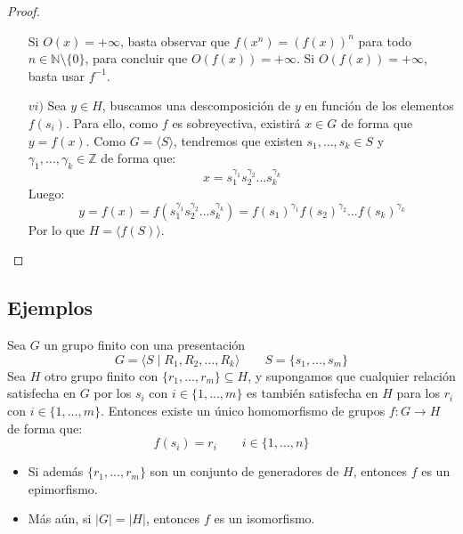 \begin{prop}
\begin{proof}
\begin{enumerate}
                Si $O(x)=+\infty$, basta observar que $f(x^n) = {(f(x))}^{n}$ para todo $n\in \mathbb{N}\setminus\{0\}$, para concluir que $O(f(x))=+\infty$. Si $O(f(x))=+\infty$, basta usar $f^{-1}$.
            \item[$vi)$] Sea $y\in H$, buscamos una descomposición de $y$ en función de los elementos $f(s_i)$. Para ello, como $f$ es sobreyectiva, existirá $x\in G$ de forma que $y = f(x)$. Como $G=\langle S \rangle $, tendremos que existen $s_1,\ldots,s_k\in S$ y $\gamma_1,\ldots,\gamma_k \in \mathbb{Z}$ de forma que:
                \begin{equation*}
                    x = s_1^{\gamma_1}s_2^{\gamma_2}\ldots s_k^{\gamma_k}
                \end{equation*}
                Luego:
                \begin{equation*}
                    y = f(x) = f(s_1^{\gamma_1}s_2^{\gamma_2}\ldots s_k^{\gamma_k}) = {f(s_1)}^{\gamma_1}{f(s_2)}^{\gamma_2} \ldots {f(s_k)}^{\gamma_k}
                \end{equation*}
                Por lo que $H = \langle f(S) \rangle $.
        \end{enumerate}
    \end{proof}
\end{prop}

\subsection{Ejemplos}
\begin{teo}[de Dyck]\label{teo:Dyck}
    Sea $G$ un grupo finito con una presentación
    \begin{equation*}
        G = \langle S\mid R_1,R_2,\ldots,R_k \rangle \qquad S = \{s_1,\ldots,s_m\}
    \end{equation*}
    Sea $H$ otro grupo finito con $\{r_1,\ldots,r_m\}\subseteq H$, y supongamos que cualquier relación satisfecha en $G$ por los $s_i$ con $i \in \{1,\ldots,m\}$ es también satisfecha en $H$ para los $r_i$ con $i \in \{1,\ldots,m\}$. Entonces existe un único homomorfismo de grupos $f:G\to H$ de forma que:
    \begin{equation*}
        f(s_i) = r_i \qquad i \in \{1,\ldots,n\}
    \end{equation*}
    \begin{itemize}
        \item Si además $\{r_1,\ldots,r_m\}$ son un conjunto de generadores de $H$, entonces $f$ es un epimorfismo.
        \item Más aún, si $|G| = |H|$, entonces $f$ es un isomorfismo.
    \end{itemize}
\end{teo}

